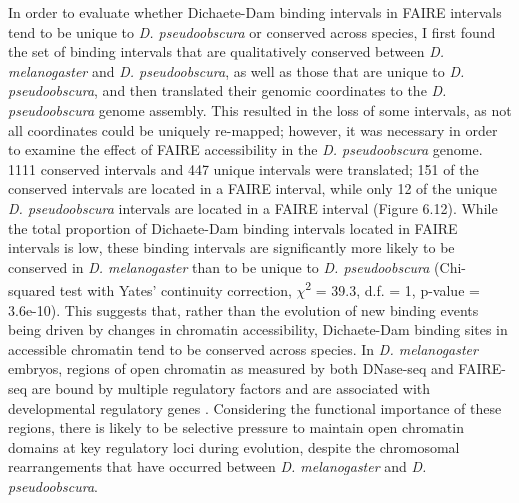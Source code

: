 In order to evaluate whether Dichaete-Dam binding intervals in FAIRE intervals tend to be unique to \emph{D. pseudoobscura} or conserved across species, I first found the set of binding intervals that are qualitatively conserved between \emph{D. melanogaster} and \emph{D. pseudoobscura}, as well as those that are unique to \emph{D. pseudoobscura}, and then translated their genomic coordinates to the \emph{D. pseudoobscura} genome assembly. This resulted in the loss of some intervals, as not all coordinates could be uniquely re-mapped; however, it was necessary in order to examine the effect of FAIRE accessibility in the \emph{D. pseudoobscura} genome. 1111 conserved intervals and 447 unique intervals were translated; 151 of the conserved intervals are located in a FAIRE interval, while only 12 of the unique \emph{D. pseudoobscura} intervals are located in a FAIRE interval (Figure 6.12). While the total proportion of Dichaete-Dam binding intervals located in FAIRE intervals is low, these binding intervals are significantly more likely to be conserved in \emph{D. melanogaster} than to be unique to \emph{D. pseudoobscura} (Chi-squared test with Yates’ continuity correction, \(\chi\)\textsuperscript{2} = 39.3, d.f. = 1, p-value = 3.6e-10). This suggests that, rather than the evolution of new binding events being driven by changes in chromatin accessibility, Dichaete-Dam binding sites in accessible chromatin tend to be conserved across species. In \emph{D. melanogaster} embryos, regions of open chromatin as measured by both DNase-seq and FAIRE-seq are bound by multiple regulatory factors and are associated with developmental regulatory genes \citep{mckay_common_2013,thomas_dynamic_2011}. Considering the functional importance of these regions, there is likely to be selective pressure to maintain open chromatin domains at key regulatory loci during evolution, despite the chromosomal rearrangements that have occurred between \emph{D. melanogaster} and \emph{D. pseudoobscura}.

